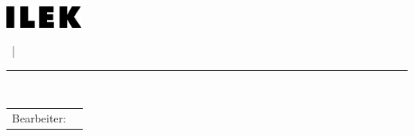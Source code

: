 \begin{titlepage}
    \graphicspath{{_A_frontmatter/02_cover/images/}}
    
	\begin{minipage}[t]{60mm}
		\begin{flushleft}
			\hspace{2.0pt}\includegraphics[width=25mm]{ILEK-logo.jpg}
		\end{flushleft}
	\end{minipage}
	\begin{minipage}[t]{70mm}
		\begin{flushleft}
			{\fontsize{14}{20}\sffamily{\arbeit}}
		\end{flushleft}	
	\end{minipage}
	\begin{minipage}[t]{33mm}
		\begin{flushright}
			{\fontsize{14}{20}\sffamily{\Nummer}~|~\textsf{\EndeJahr}}
		\end{flushright}
	\end{minipage}
	\begin{center} 
		\vspace{-16.0pt}\nointerlineskip\rule{\textwidth}{0.4pt}\\ 
		\vspace{2.0pt}\nointerlineskip
	\end{center}
	
	\vspace{10mm}
	\hspace{60mm}
	\begin{minipage}[c]{105mm}
		\begin{minipage}[t][4cm][c]{\textwidth}
			\LARGE{\textsf{\titel}}
		\end{minipage}
		\hspace{0mm} 
		
		\vspace{5mm}
		\hspace{-3.0mm} 
		\begin{tabular}{p{2.5cm}l}
			\fontsize{12}{20}\textsf{Bearbeiter:}&\textsf{\student} \\
		\end{tabular}
		

\end{minipage}
\end{titlepage}

